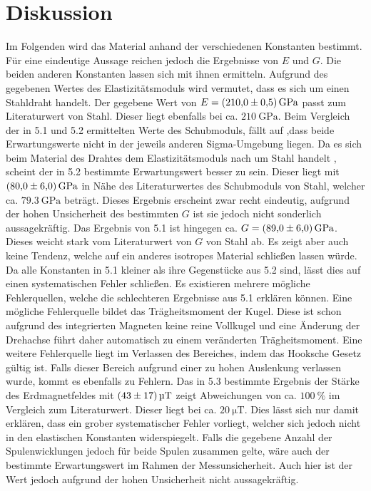 
\section{Diskussion}
\label{sec:Diskussion}
Im Folgenden wird das Material anhand der verschiedenen Konstanten bestimmt.
 Für eine eindeutige Aussage reichen jedoch die Ergebnisse von $E$ und $G$. Die beiden anderen Konstanten lassen
 sich mit ihnen ermitteln.
Aufgrund des gegebenen Wertes des Elastizitätsmoduls wird vermutet, dass es sich um einen Stahldraht handelt.
Der gegebene Wert von $E = \SI{210 \pm 0.5}{\giga\pascal}$ passt zum Literaturwert von Stahl. Dieser liegt ebenfalls bei
 ca. $\SI{210}{\giga\pascal}$\cite[624\psq]{TaschenbuchPhysik}.
Beim Vergleich der in 5.1 und 5.2 ermittelten Werte des Schubmoduls, fällt auf
 ,dass beide Erwartungswerte nicht in der jeweils anderen Sigma-Umgebung liegen.
 Da es sich beim Material des Drahtes dem Elastizitätsmoduls nach um Stahl handelt
, scheint der in 5.2 bestimmte Erwartungswert besser zu sein. Dieser liegt mit $\SI{80.0 \pm 6.0}{\giga\pascal}$ in Nähe
  des Literaturwertes des Schubmoduls von Stahl, welcher ca. $\SI{79.3}{\giga\pascal}$\cite{EinführungMechanik} beträgt.
      Dieses Ergebnis erscheint zwar recht eindeutig, aufgrund der hohen
      Unsicherheit des bestimmten $G$ ist sie jedoch nicht sonderlich aussagekräftig.
      Das Ergebnis von 5.1 ist hingegen ca. $G =\SI{89.0 \pm 6.0}{\giga\pascal}$.
      Dieses weicht stark vom Literaturwert von $G$ von Stahl ab. Es zeigt aber auch
      keine Tendenz, welche auf ein anderes isotropes Material schließen lassen würde.
      Da alle Konstanten in 5.1 kleiner als ihre Gegenstücke aus 5.2 sind, lässt dies auf einen systematischen Fehler schließen.
     Es existieren mehrere mögliche Fehlerquellen, welche die schlechteren
      Ergebnisse aus 5.1 erklären können. Eine mögliche Fehlerquelle bildet das
       Trägheitsmoment der Kugel. Diese ist schon aufgrund des integrierten
        Magneten keine reine Vollkugel und eine Änderung der Drehachse führt daher
         automatisch zu einem veränderten Trägheitsmoment. Eine weitere
          Fehlerquelle liegt im Verlassen des Bereiches, indem das Hooksche
           Gesetz gültig ist. Falls dieser Bereich aufgrund einer zu hohen
            Auslenkung verlassen wurde, kommt es ebenfalls zu Fehlern.
            Das in 5.3 bestimmte Ergebnis der Stärke des Erdmagnetfeldes mit $\SI{43 \pm 17}{\micro\tesla}$ zeigt Abweichungen von ca. $\SI{100}{\percent}$
            im Vergleich zum Literaturwert. Dieser liegt bei ca. $\SI{20}{\micro\tesla}$\cite{Erdmagnetfeld}. Dies lässt sich nur damit erklären, dass ein grober systematischer Fehler vorliegt,
             welcher sich jedoch nicht in den elastischen Konstanten widerspiegelt.
              Falls die gegebene Anzahl der Spulenwicklungen jedoch für beide Spulen
               zusammen gelte, wäre auch der bestimmte Erwartungswert im Rahmen der Messunsicherheit.
 Auch hier ist der Wert jedoch aufgrund der hohen Unsicherheit nicht aussagekräftig.

